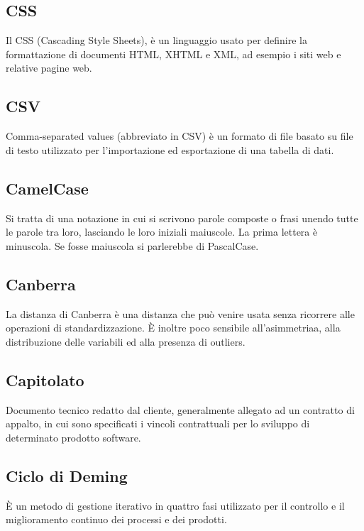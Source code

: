 \documentclass[../glossario.tex]{subfiles}
\begin{document}
\subsection*{CSS}
{}
Il CSS (Cascading Style Sheets), è un linguaggio usato per definire la formattazione di documenti HTML, XHTML e XML, ad esempio i siti web e relative pagine web.

\subsection*{CSV}
{}
Comma-separated values (abbreviato in CSV) è un formato di file basato su file di testo utilizzato per l'importazione ed esportazione di una tabella di dati.

\subsection*{CamelCase}
{}
Si tratta di una notazione in cui si scrivono parole composte o frasi unendo tutte le parole tra loro, lasciando le loro iniziali maiuscole. La prima lettera è minuscola. Se fosse maiuscola si parlerebbe di PascalCase.

\subsection*{Canberra}
{}
La distanza di Canberra è una distanza che può venire usata senza ricorrere alle operazioni di standardizzazione. È inoltre poco sensibile all'asimmetriaa, alla distribuzione delle variabili ed alla presenza di outliers.

\subsection*{Capitolato}
{}
Documento tecnico redatto dal cliente, generalmente allegato ad un contratto di appalto, in cui sono specificati i vincoli contrattuali per lo sviluppo di determinato prodotto software.


\subsection*{Ciclo di Deming}
{}
È un metodo di gestione iterativo in quattro fasi utilizzato per il controllo e il miglioramento continuo dei processi e dei prodotti.
\end{document}

